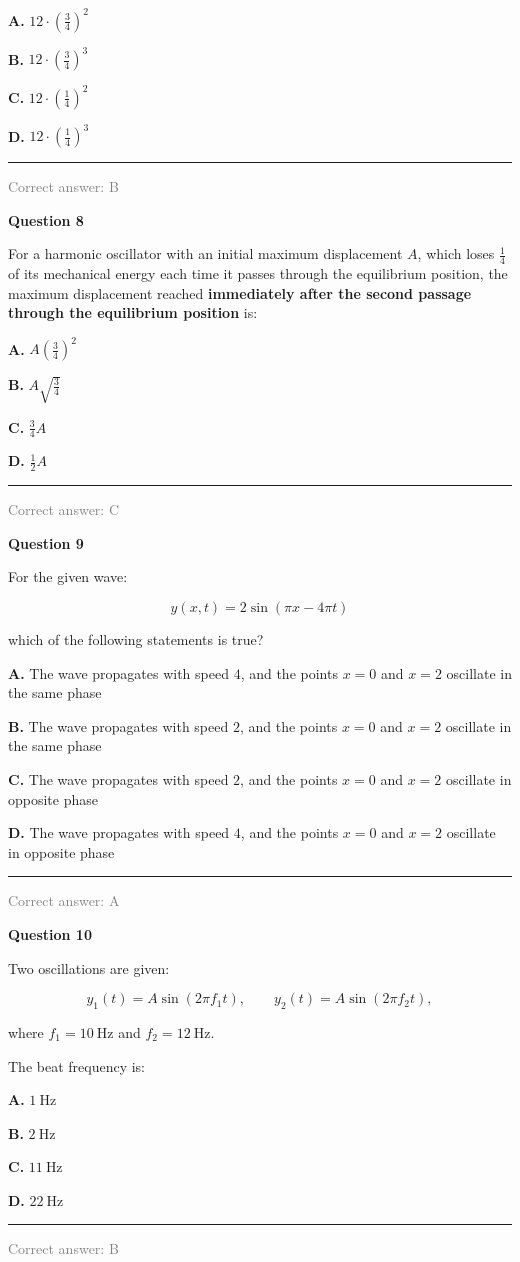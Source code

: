 \documentclass[11pt,a4paper]{article}
\newcommand{\answernote}[1]{%
\vfill
\noindent\textcolor{gray}{\rule{\linewidth}{0.4pt}}

{\small\textcolor{gray}{Correct answer: #1}}
}
\begin{document}
{\large
\textbf{A.} $12\cdot\left(\frac{3}{4}\right)^2$

\textbf{B.} $12\cdot\left(\frac{3}{4}\right)^3$

\textbf{C.} $12\cdot\left(\frac{1}{4}\right)^2$

\textbf{D.} $12\cdot\left(\frac{1}{4}\right)^3$
}

\answernote{B}
\newpage

{\LARGE\textbf{Question 8}}

For a harmonic oscillator with an initial maximum displacement $A$, which loses $\frac{1}{4}$ of its mechanical energy each time it passes through the equilibrium position, the maximum displacement reached \textbf{immediately after the second passage through the equilibrium position} is:

\vspace{0.5em}

{\large
\textbf{A.} $A\left(\frac{3}{4}\right)^2$

\textbf{B.} $A\sqrt{\frac{3}{4}}$

\textbf{C.} $\frac{3}{4}A$

\textbf{D.} $\frac{1}{2}A$
}

\answernote{C}
\newpage

{\LARGE\textbf{Question 9}}

For the given wave:

\[
y(x,t)=2\sin(\pi x-4\pi t)
\]

which of the following statements is true?

\vspace{0.5em}

{\large
\textbf{A.} The wave propagates with speed $4$, and the points $x=0$ and $x=2$ oscillate in the same phase

\textbf{B.} The wave propagates with speed $2$, and the points $x=0$ and $x=2$ oscillate in the same phase

\textbf{C.} The wave propagates with speed $2$, and the points $x=0$ and $x=2$ oscillate in opposite phase

\textbf{D.} The wave propagates with speed $4$, and the points $x=0$ and $x=2$ oscillate in opposite phase
}

\answernote{A}
\newpage

{\LARGE\textbf{Question 10}}

Two oscillations are given:

\[
y_1(t)=A\sin(2\pi f_1 t), \qquad y_2(t)=A\sin(2\pi f_2 t),
\]

where $f_1=10\ \text{Hz}$ and $f_2=12\ \text{Hz}$.

The beat frequency is:

\vspace{0.5em}

{\large
\textbf{A.} $1\ \text{Hz}$

\textbf{B.} $2\ \text{Hz}$

\textbf{C.} $11\ \text{Hz}$

\textbf{D.} $22\ \text{Hz}$
}

\answernote{B}
\end{document}
